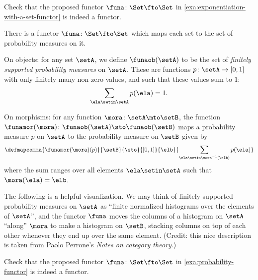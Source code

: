 \begin{gradedexercise}
    \label{ex:ExponentiationWithASet}
    Check that the proposed functor $\funa \colon \Set \fto \Set$ in \cref{exa:exponentiation-with-a-set-functor} is indeed a functor.
\end{gradedexercise}

\begin{example}
    \label{exa:probability-functor}
    There is a functor $\funa \colon \Set \fto \Set$ which maps each set to the set of probability measures on it.

    On objects: for any set $\setA$, we define $\funaob(\setA)$ to be the set of \emph{finitely supported probability measures} on $\setA$.
    These are functions $p \colon \setA \to [0,1]$ with only finitely many non-zero values, and such that these values sum to $1$:
    \begin{equation}\label{eq:probability-measure}
        \sum_{\ela \setin \setA} p(\ela) = 1.
    \end{equation}

    On morphisms: for any function $\mora \colon \setA \mto \setB$, the function $\funamor(\mora) \colon \funaob(\setA) \sto \funaob(\setB)$ maps a probability measure $p$ on $\setA$ to the probability measure on $\setB$ given by
    \begin{equation}
        \defmapcomma{\funamor(\mora)(p)}{\setB}{\sto}{[0,1]}{\elb}{\sum_{\ela \setin \mora^{-1}(\elb)} p(\ela)}
    \end{equation}
    where the sum ranges over all elements $\ela \setin \setA$ such that $\mora(\ela) = \elb$.

    The following is a helpful visualization.
    We may think of finitely supported probability measures on $\setA$ as ``finite normalized histograms over the elements of $\setA$'', and the functor $\funa$ moves the columns of a histogram on $\setA$ ``along'' $\mora$ to make a histogram on $\setB$, stacking columns on top of each other whenever they end up over the same element.
    (Credit: this nice description is taken from Paolo Perrone's \emph{Notes on category theory}.)
\end{example}

\begin{gradedexercise}
    \label{ex:probability-functor}
    Check that the proposed functor $\funa \colon \Set \fto \Set$ in \cref{exa:probability-functor} is indeed a functor.
\end{gradedexercise}

